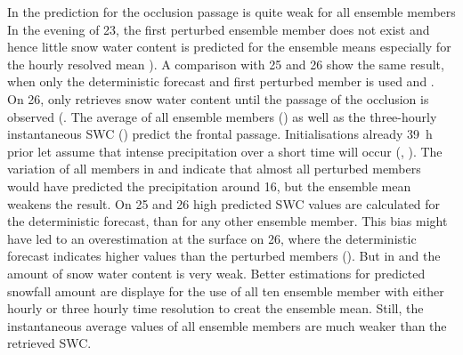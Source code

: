 In  the prediction for the occlusion passage is quite weak for all ensemble members 
\\
In the evening of \SI{23}{\dec}, the first perturbed ensemble member does not exist and hence little snow water content is predicted for the ensemble means especially for the hourly resolved mean ). 
A comparison with \num{25} and \SI{26}{\dec} show the same result, when only the deterministic forecast and first perturbed member is used  and . 
\\ 
On \SI{26}{\dec}, only retrieves snow water content until the passage of the occlusion is observed (. The average of all ensemble members () as well as the three-hourly instantaneous SWC () predict the frontal passage. 
Initialisations already \SI{39}{\hour} prior let assume that intense precipitation over a short time will occur (, ). The variation of all members in  and  indicate that almost all perturbed members would have predicted the precipitation around \SI{16}{\UTC}, but the ensemble mean weakens the result. 
On \num{25} and \SI{26}{\dec} high predicted SWC values are calculated for the deterministic forecast, than for any other ensemble member. 
This bias might have led to an overestimation at the surface on \SI{26}{\dec}, where the deterministic forecast indicates higher values than the perturbed members (). But in  and  the amount of snow water content is very weak. 
Better estimations for predicted snowfall amount are displaye for the use of all ten ensemble member with either hourly or three hourly time resolution to creat the ensemble mean.
Still, the instantaneous average values of all ensemble members are much weaker than the retrieved SWC.
\\
